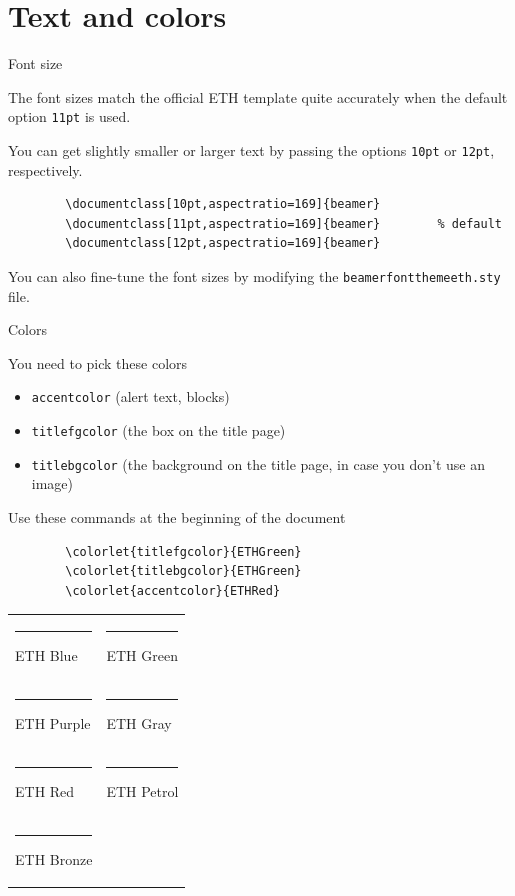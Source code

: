 \documentclass[11pt,aspectratio=169]{beamer}
\begin{document}
\section{Text and colors}

\begin{frame}[fragile]{Font size}

	The font sizes match the official ETH template quite accurately when the default option \verb+11pt+ is used.
	
	\bigskip
	
	You can get slightly smaller or larger text by passing the options \verb+10pt+ or \verb+12pt+, respectively.
	\begin{verbatim}
		\documentclass[10pt,aspectratio=169]{beamer}
		\documentclass[11pt,aspectratio=169]{beamer}		% default
		\documentclass[12pt,aspectratio=169]{beamer}
	\end{verbatim}	
	
	\bigskip
	You can also fine-tune the font sizes by modifying the \verb+beamerfontthemeeth.sty+ file.

\end{frame}

\begin{frame}[fragile]{Colors}

	You need to pick these colors
	\begin{itemize}
		\item \texttt{accentcolor} (alert text, blocks)
		\item \texttt{titlefgcolor} (the box on the title page)
		\item \texttt{titlebgcolor} (the background on the title page, in case you don't use an image)
	\end{itemize}
	Use these commands at the beginning of the document
	\begin{verbatim}
		\colorlet{titlefgcolor}{ETHGreen}
		\colorlet{titlebgcolor}{ETHGreen}
		\colorlet{accentcolor}{ETHRed}
	\end{verbatim}

	\medskip

	\begin{tabular}{ll}
	\textcolor{ETHBlue}{\rule{4mm}{3mm}} ETH Blue &
	\textcolor{ETHGreen}{\rule{4mm}{3mm}} ETH Green \\
	\textcolor{ETHPurple}{\rule{4mm}{3mm}} ETH Purple &
	\textcolor{ETHGray}{\rule{4mm}{3mm}} ETH Gray \\
	\textcolor{ETHRed}{\rule{4mm}{3mm}} ETH Red &
	\textcolor{ETHPetrol}{\rule{4mm}{3mm}} ETH Petrol \\
	\textcolor{ETHBronze}{\rule{4mm}{3mm}} ETH Bronze
	\end{tabular}
	
\end{frame}
\end{document}
